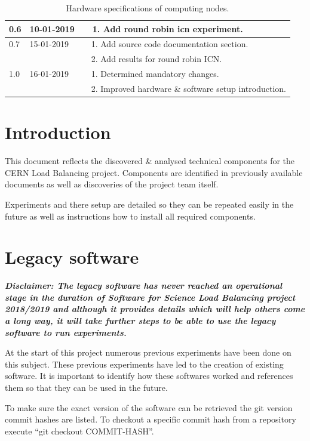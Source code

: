 \documentclass[]{article}
\newcommand{\tabitemNum}{~~}
\begin{document}
\begin{table}[H]
\begin{center}
\begin{tabularx}{\textwidth}{ | l | l | X | }
			\multirow{1}{*}{0.6} & 10-01-2019 & \tabitemNum 1. Add round robin icn experiment. \\ \hline
			
			\multirow{1}{*}{0.7} & 15-01-2019 & \tabitemNum 1. Add source code documentation section. \\
			& & \tabitemNum 2. Add results for round robin ICN. \\ \hline
			
			\multirow{1}{*}{1.0} & 16-01-2019 & \tabitemNum 1. Determined mandatory changes. \\
			& & \tabitemNum 2. Improved hardware \& software setup introduction. \\ \hline
		\end{tabularx}
		\caption{Hardware specifications of computing nodes.}
		\label{tab:specs}
	\end{center}
\end{table}
\newpage

\tableofcontents{}
\newpage


\section{Introduction}
This document reflects the discovered \& analysed technical components for the CERN Load Balancing project. Components are identified in previously available documents as well as discoveries of the project team itself. 

Experiments and there setup are detailed so they can be repeated easily in the future as well as instructions how to install all required components. 


\section{Legacy software}
\textit{\textbf{Disclaimer: The legacy software has never reached an operational stage in the duration of Software for Science Load Balancing project 2018/2019 and although it provides details which will help others come a long way, it will take further steps to be able to use the legacy software to run experiments.}}

At the start of this project numerous previous experiments have been done on this subject. These previous experiments have led to the creation of existing software. It is important to identify how these softwares worked and references them so that they can be used in the future.

To make sure the exact version of the software can be retrieved the git version commit hashes are listed. To checkout a specific commit hash from a repository execute “git checkout COMMIT-HASH”.
\end{document}

